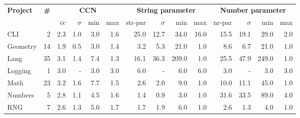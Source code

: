 \begin{tabular}{ l r | r@{\hskip 0.08in}r@{\hskip 0.08in}r@{\hskip 0.08in}r | r@{\hskip 0.08in}r@{\hskip 0.08in}r@{\hskip 0.08in}r | r@{\hskip 0.08in}r@{\hskip 0.08in}r@{\hskip 0.08in}r }
\hline 
\textbf{Project} & \textbf{\#} & \multicolumn{4}{c}{\textbf{CCN}} & \multicolumn{4}{c}{\textbf{String parameter}} & \multicolumn{4}{c}{\textbf{Number parameter}} \\ 
  &   & $\overline{\text{cc}}$ & $\sigma$ & min & max & $\overline{\text{str-par}}$ & $\sigma$ & min & max & $\overline{\text{nr-par}}$ & $\sigma$ & min & max \\ 
\hline 
CLI & 2 &2.3 &1.0 &3.0 & 1.6 &25.0 &12.7 &34.0 & 16.0 &15.5 &19.1 &29.0 & 2.0 \\ 
Geometry & 14 &1.9 &0.5 &3.0 & 1.4 &3.2 &5.3 &21.0 & 1.0 &8.6 &6.7 &21.0 & 1.0 \\ 
Lang & 35 &3.1 &1.4 &7.4 & 1.3 &16.1 &36.3 &209.0 & 1.0 &25.5 &47.9 &249.0 & 1.0 \\ 
Logging & 1 &3.0 &- &3.0 & 3.0 &6.0 &- &6.0 & 6.0 &3.0 &- &3.0 & 3.0 \\ 
Math & 23 &3.2 &1.6 &7.7 & 1.5 &2.6 &2.0 &9.0 & 1.0 &10.0 &11.1 &45.0 & 1.0 \\ 
Numbers & 5 &2.8 &1.1 &4.5 & 1.6 &1.4 &0.9 &3.0 & 1.0 &31.6 &33.5 &89.0 & 4.0 \\ 
RNG & 7 &2.6 &1.3 &5.0 & 1.7 &1.7 &1.9 &6.0 & 1.0 &2.6 &1.3 &4.0 & 1.0 \\ 
\hline 
\end{tabular}